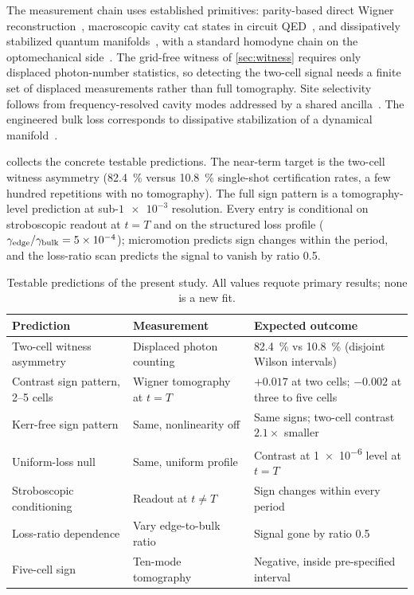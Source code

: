 \documentclass[aps,pra,preprint,superscriptaddress,amsmath,amssymb]{revtex4-2}
\begin{document}
The measurement chain uses established primitives: parity-based direct Wigner reconstruction~\cite{Lutterbach1997}, macroscopic cavity cat states in circuit QED~\cite{Vlastakis2013}, and dissipatively stabilized quantum manifolds~\cite{Touzard2018}, with a standard homodyne chain on the optomechanical side~\cite{Aspelmeyer2014}. The grid-free witness of \cref{sec:witness} requires only displaced photon-number statistics, so detecting the two-cell signal needs a finite set of displaced measurements rather than full tomography. Site selectivity follows from frequency-resolved cavity modes addressed by a shared ancilla~\cite{Blais2021Circuit}. The engineered bulk loss corresponds to dissipative stabilization of a dynamical manifold~\cite{Touzard2018}.

 collects the concrete testable predictions. The near-term target is the two-cell witness asymmetry (\qty{82.4}{\percent} versus \qty{10.8}{\percent} single-shot certification rates, a few hundred repetitions with no tomography). The full sign pattern is a tomography-level prediction at sub-$\num{1e-3}$ resolution. Every entry is conditional on stroboscopic readout at $t=T$ and on the structured loss profile ($\gamma_{\rm edge}/\gamma_{\rm bulk}=\num{5e-4}$); micromotion predicts sign changes within the period, and the loss-ratio scan predicts the signal to vanish by ratio \num{0.5}.

\begin{table}[!htbp]
\renewcommand{\arraystretch}{1.3}
\caption{Testable predictions of the present study. All values requote primary results; none is a new fit.}
\label{tab:testable}
\begin{tabularx}{\linewidth}{lXX}
\hline
Prediction & Measurement & Expected outcome \\
\hline
Two-cell witness asymmetry & Displaced photon counting & \qty{82.4}{\percent} vs \qty{10.8}{\percent} (disjoint Wilson intervals) \\
Contrast sign pattern, 2--5 cells & Wigner tomography at $t=T$ & $+\num{0.017}$ at two cells; $-\num{0.002}$ at three to five cells \\
Kerr-free sign pattern & Same, nonlinearity off & Same signs; two-cell contrast $\num{2.1}\times$ smaller \\
Uniform-loss null & Same, uniform profile & Contrast at \num{1e-6} level at $t=T$ \\
Stroboscopic conditioning & Readout at $t\ne T$ & Sign changes within every period \\
Loss-ratio dependence & Vary edge-to-bulk ratio & Signal gone by ratio \num{0.5} \\
Five-cell sign & Ten-mode tomography & Negative, inside pre-specified interval \\
\hline
\end{tabularx}
\end{table}
\end{document}
